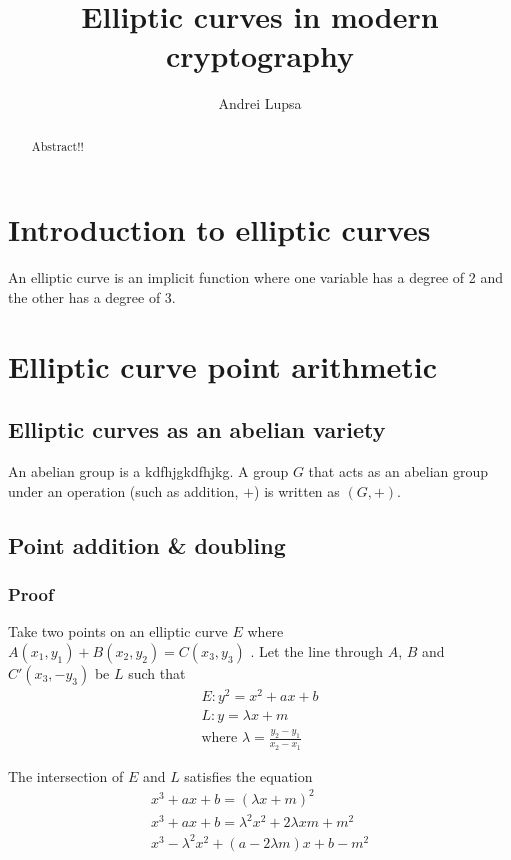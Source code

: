 \documentclass[a4paper]{article}
\title{Elliptic curves in modern cryptography}
\author{Andrei Lupsa}
\begin{document}
\maketitle

\begin{abstract}
Abstract!!
\end{abstract}


\section{Introduction to elliptic curves}

An elliptic curve is an implicit function where one variable has a degree of 2 and the other has a degree of 3. 


\section{Elliptic curve point arithmetic}

\subsection{Elliptic curves as an abelian variety}

An abelian group is a kdfhjgkdfhjkg. A group $G$ that acts as an abelian group under an operation (such as addition, $+$) is written as $(G, +)$.

\subsection{Point addition \& doubling}

\subsubsection{Proof}

Take two points on an elliptic curve $E$ where $A(x_1, y_1) + B(x_2, y_2) = C(x_3, y_3)$ . Let the line through $A$, $B$ and $C'(x_3, -y_3)$ be $L$ such that
\begin{gather*}
    E: y^2 = x^2 + ax + b \\
    L: y = \lambda x + m \\
    \text{where } \lambda = \frac{y_2-y_1}{x_2-x_1}
\end{gather*}

The intersection of $E$ and $L$ satisfies the equation
\begin{align*}
    x^3 + ax + b = (\lambda x + m)^2 \\
    x^3 + ax + b = \lambda^2 x^2 + 2 \lambda x m + m^2 \\
    x^3 - \lambda^2 x^2 + (a - 2 \lambda m)x + b - m^2
\end{align*}
\end{document}
